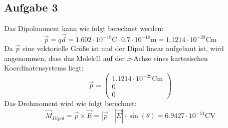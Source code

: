 \documentclass{article}
\begin{document}
\subsection*{Aufgabe 3}
Das Dipolmoment kann wie folgt berechnet werden:
\begin{equation*}
    \vec{p} = q\vec{d} = 1.602 \cdot 10^{-19} \mathrm{C} \cdot 0.7 \cdot 10^{-10} \mathrm{m} = 1.1214 \cdot 10^{-29} \mathrm{Cm} 
\end{equation*}
Da $\vec{p}$ eine vektorielle Größe ist und der Dipol linear aufgebaut ist, wird angenommen, dass das Molekül auf der $x$-Achse eines kartesischen Koordinatensystems liegt:
\begin{equation*}
    \vec{p} = \left(\begin{array}{c}1.1214 \cdot 10^{-29} \mathrm{Cm} \\0\\0\end{array}\right)
\end{equation*}
Das Drehmoment wird wie folgt berechnet:
\begin{equation*}
    \vec{M}_{Dipol} = \vec{p} \times \vec{E} = |\vec{p}| \cdot |\vec{E}| \cdot \sin(\theta) = 6.9427 \cdot 10^{-14} \mathrm{CV}
\end{equation*}
\end{document}
